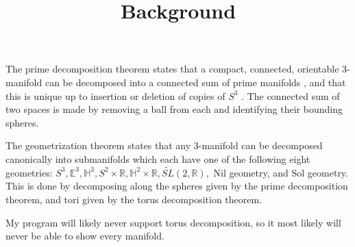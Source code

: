 \documentclass[12pt]{amsart}
\newcommand{\ignore}[1]{}
\begin{document}
\title{Background}
\maketitle

\ignore{1.  Describe 3-manifold decompositions.
  A.  Prime decomposition theorem -- see Allen Hatcher's notes for statement and references.

}
\ignore{@Misc{•,
OPTkey = {•},
OPTauthor = {Allen Hatcher},
OPTtitle = {Notes on Basic 3-Manifold Topology},
OPThowpublished = {•},
OPTmonth = {•},
OPTyear = {•},
OPTnote = {•},
OPTannote = {•}
}}

The prime decomposition theorem states that a compact, connected, orientable 3-manifold can be decomposed into a connected sum of prime manifolds \cite{Kneser}, and that this is unique up to insertion or deletion of copies of $S^3$ \cite{Milnor}. The connected sum of two spaces is made by removing a ball from each and identifying their bounding spheres.
  
  

The geometrization theorem states that any 3-manifold can be decomposed canonically into submanifolds which each have one of the following eight geometries: $S^3, \mathbb{E}^3, \mathbb{H}^3, S^2 \times \mathbb{R}, \mathbb{H}^2 \times \mathbb{R}, \tilde{SL}(2,\mathbb{R}),$ Nil geometry, and Sol geometry. This is done by decomposing along the spheres given by the prime decomposition theorem, and tori given by the torus decomposition theorem. \cite{Perelman1} \cite{Perelman2} \cite{Perelman3}

My program will likely never support torus decomposition, so it most likely will never be able to show every manifold.


\end{document}
